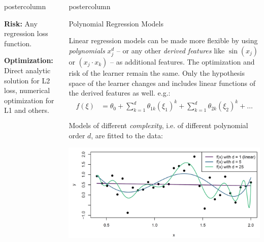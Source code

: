 \documentclass{beamer}
\begin{document}
\begin{frame}[fragile]{}
\begin{columns}
\begin{column}{.31\textwidth}
\begin{beamercolorbox}[center]{postercolumn}
\begin{minipage}{.98\textwidth}
{\begin{myblock}
  \textbf{Risk:} Any regression loss function.
  
  \vspace*{1ex}
  
  \textbf{Optimization:} Direct analytic solution for L2 loss, numerical optimization for L1 and others.
  \end{myblock}
  
}
\end{minipage}
\end{beamercolorbox}
\end{column}
\begin{column}{.31\textwidth}
\begin{beamercolorbox}[center]{postercolumn}
\begin{minipage}{.98\textwidth}
\parbox[t][\columnheight]{\textwidth}{
  \begin{myblock}{Polynomial Regression Models}
  
    Linear regression models can be made more flexible by using \emph{polynomials} $x_j^d$ -- or any other \emph{derived features} like $\sin(x_j)$ or $(x_j \cdot x_k)$ -- as additional features. The optimization and risk of the learner remain the same.\vspace*{1ex}
    Only the hypothesis space of the learner changes and includes linear functions of the derived features as well. e.g.:
      \begin{align*}
    f(\xi) &= \theta_0 + \sum^d_{k=1} \theta_{1k} \left(\xi_1\right)^k + \sum^d_{k=1} \theta_{2k} \left(\xi_2\right)^k + \dots
    \end{align*}
    
    Models of different \emph{complexity}, i.e. of different polynomial order $d$, are fitted to the data:
    
    \includegraphics[width=0.9\columnwidth]{img/poly_reg.PNG}
  


\end{myblock}}
\end{minipage}
\end{beamercolorbox}
\end{column}
\end{columns}
\end{frame}
\end{document}
